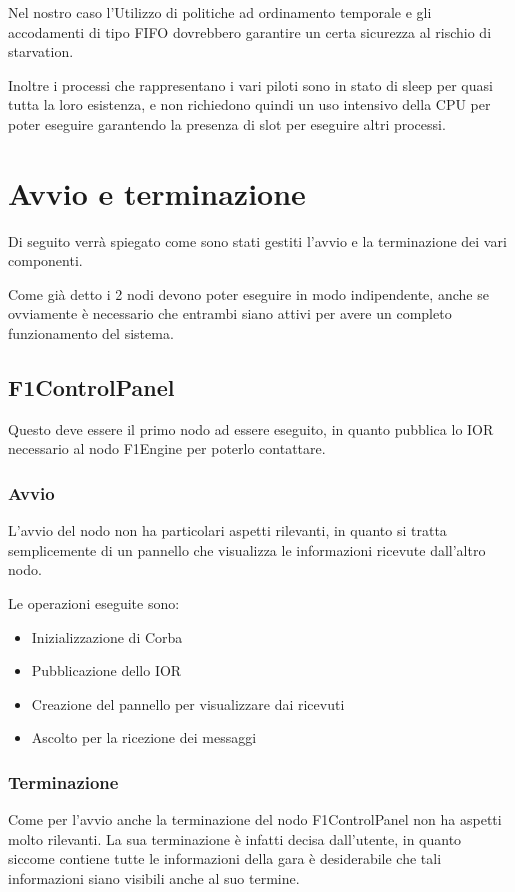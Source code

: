 \documentclass[a4paper,11pt, twoside]{book}
\begin{document}
      Nel nostro caso l'Utilizzo di politiche ad ordinamento temporale e gli accodamenti di tipo FIFO dovrebbero
      garantire un certa sicurezza al rischio di starvation.
      
      Inoltre i processi che rappresentano i vari piloti sono in stato di sleep per quasi tutta la loro esistenza,
      e non richiedono quindi un uso intensivo della CPU per poter eseguire garantendo la presenza di slot per
      eseguire altri processi.
    
    \section{Avvio e terminazione}
      Di seguito verrà spiegato come sono stati gestiti l'avvio e la terminazione dei vari componenti.
      
      Come già detto i 2 nodi devono poter eseguire in modo indipendente, anche se ovviamente
      è necessario che entrambi siano attivi per avere un completo funzionamento del sistema.
      
      \subsection{F1ControlPanel}
        Questo deve essere il primo nodo ad essere eseguito, in quanto pubblica lo IOR necessario al nodo F1Engine
	per poterlo contattare.
	
	\subsubsection{Avvio}
	  L'avvio del nodo non ha particolari aspetti rilevanti, in quanto si tratta semplicemente di un
	  pannello che visualizza le informazioni ricevute dall'altro nodo.
	  
	  Le operazioni eseguite sono:
	  
	  \begin{itemize}
	    \item Inizializzazione di Corba
	    \item Pubblicazione dello IOR
	    \item Creazione del pannello per visualizzare  dai ricevuti
	    \item Ascolto per la ricezione dei messaggi
	  \end{itemize}
	  
	\subsubsection{Terminazione}
	  Come per l'avvio anche la terminazione del nodo F1ControlPanel non ha aspetti molto rilevanti. 
	  La sua terminazione è infatti decisa dall'utente, in quanto siccome contiene tutte le informazioni
	  della gara è desiderabile che tali informazioni siano visibili anche al suo termine.
	  
\end{document}
